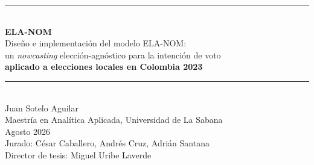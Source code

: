 {
\begin{frame}[plain]
  \vspace{1.2cm}
  \begin{center}
    {\color{barBlue}\rule{0.85\textwidth}{1.5pt}}\\[0.5em]
    {\color{barBlue}\Large\bfseries ELA-NOM}\\[0.3em]
    {\color{keyBlue}\normalsize
      Diseño e implementación del modelo ELA-NOM:\\
      un \textit{nowcasting} elección-agnóstico para la intención de voto\\
      \textbf{aplicado a elecciones locales en Colombia 2023}}\\[0.4em]
    {\color{barBlue}\rule{0.85\textwidth}{1.5pt}}\\[1.0em]

    {\color{darkText}\normalsize Juan Sotelo Aguilar}\\[0.15em]
    {\color{subtleGray}\small
      Maestría en Analítica Aplicada, Universidad de La Sabana}\\[0.15em]
    {\color{subtleGray}\small Agosto 2026}\\[1.0em]

    {\color{subtleGray}\footnotesize
      Jurado: César Caballero, Andrés Cruz, Adrián Santana\\
      Director de tesis: Miguel Uribe Laverde}
  \end{center}
\end{frame}
}

